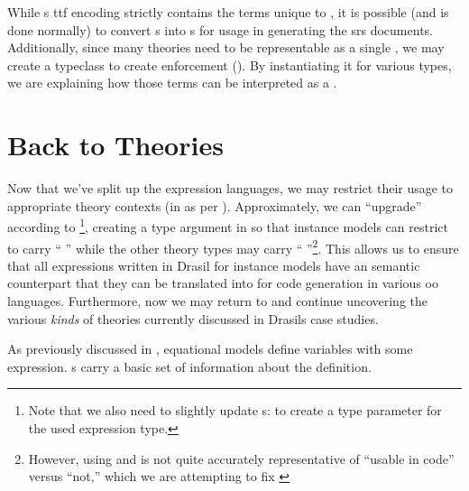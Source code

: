 While \ModelExpr{}s \acs{ttf} encoding strictly contains the terms unique to
\ModelExpr{}, it is possible (and is done normally) to convert \Expr{}s into
\ModelExpr{}s for usage in generating the \acs{srs} documents. Additionally,
since many theories need to be representable as a single \Relation{}, we may
create a typeclass to create enforcement (). By
instantiating it for various types, we are explaining how those terms can be
interpreted as a \ModelExpr{}.

\currentExpressHaskell{}
 
\section{Back to Theories}
\label{chap:lang-division:sec:back-to-theories}

Now that we've split up the expression languages, we may restrict their usage to
appropriate theory contexts (in \ModelKinds{} as per ).
Approximately, we can ``upgrade'' \ModelKinds according to
 \footnote{Note that we also need to
slightly update \QDefinition{}s:  to create a
type parameter for the used expression type.}, creating a type argument in
\ModelKinds{} so that instance models can restrict to carry ``\ModelKinds{}
\Expr{}'' while the other theory types may carry ``\ModelKinds{}
\ModelExpr{}''\footnote{However, using \Expr{} and \ModelExpr{} is not quite
accurately representative of ``usable in code'' versus ``not,'' which we are
attempting to fix \cite{DrasilIssue2853AlternativeModelKinds}}. This allows us
to ensure that all expressions written in Drasil for instance models have an
semantic counterpart that they can be translated into for code generation in
various \acs{oo} languages. Furthermore, now we may return to \ModelKinds{} and
continue uncovering the various \textit{kinds} of theories currently discussed
in Drasils case studies.

\pseudoPartialModelKindsUpgrade{}



As previously discussed in , equational models define
variables with some expression. \QDefinition{}s carry a basic set of information
about the definition.

\currentLandPosIMHaskell{}

\currentQDefinitionHaskell{}
